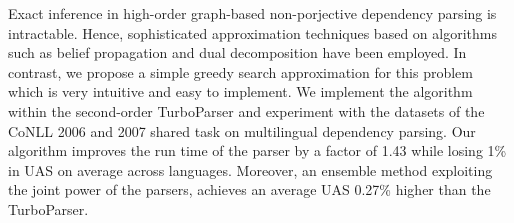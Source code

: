Exact inference in high-order graph-based non-porjective dependency parsing is intractable. Hence, sophisticated approximation techniques based on algorithms such as belief propagation and dual decomposition have been employed. In contrast, we propose a simple greedy search approximation for this problem which is very intuitive and easy to implement. We implement the algorithm within the second-order TurboParser and experiment with the datasets of the CoNLL 2006 and 2007 shared task on multilingual dependency parsing. Our algorithm improves the run time of the parser by a factor of 1.43 while losing 1\% in UAS on average across languages. Moreover, an ensemble method exploiting the joint power of the parsers, achieves an average UAS 0.27\% higher than the TurboParser.
